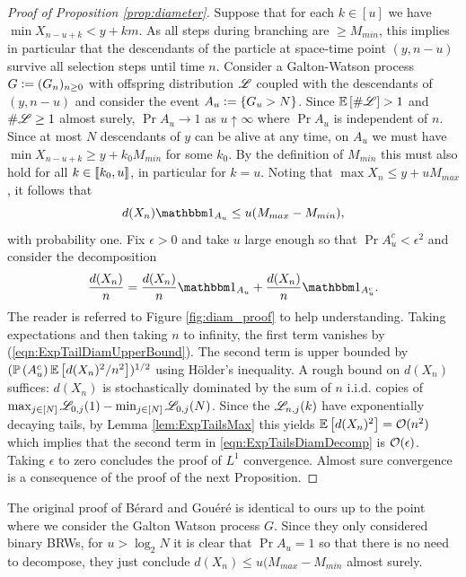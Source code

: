 \begin{proof}[Proof of Proposition \ref{prop:diameter}]
Suppose that for each $k \in [u]$ we have $\min X_{n - u + k} < y + k m$. As all steps during branching are $ \geq M_{min}$, this implies in particular that the descendants of the particle at space-time point $(y, n-u)$ survive all selection steps until time $n$. Consider a Galton-Watson process $G \defeq (G_n)_{n \geq 0}$ with offspring distribution $\scr{L}$ coupled with the descendants of $(y, n-u)$ and consider the event $A_u \defeq \{ G_u > N\}$. Since $\Ex{\#\scr{L}} > 1$ and $\#\scr{L} \geq 1$ almost surely, $\Pr{A_u} \to 1$ as $u \uparrow \infty$ where $\Pr{A_u}$ is independent of $n$. Since at most $N$ descendants of $y$ can be alive at any time, on $A_u$ we must have $\min X_{n - u + k} \geq y + k_0 M_{min}$ for some $k_0$. By the definition of $M_{min}$ this must also hold for all $k \in \bbracket{k_0, u}$, in particular for $k = u$. Noting that $\max X_n \leq y + u M_{max}$, it follows that 
\begin{equation}\label{eqn:ExpTailDiamUpperBound}
d(X_n)\Ind_{A_u} \leq u (M_{max} - M_{min}), 
\end{equation}
with probability one. Fix $\epsilon > 0$ and take $u$ large enough so that $\Pr{A_u^c} < \epsilon^2$ and consider the decomposition
\begin{equation}\label{eqn:ExpTailsDiamDecomp}
\frac{d(X_n)}{n} = \frac{d(X_n)}{n} \Ind_{A_u} + \frac{d(X_n)}{n} \Ind_{A_u^c}. 
\end{equation}
The reader is referred to Figure \ref{fig:diam_proof} to help understanding. Taking expectations and then taking $n$ to infinity, the first term vanishes by (\ref{eqn:ExpTailDiamUpperBound}). The second term is upper bounded by $(\Pr{A_u^c} \Ex{d(X_n)^2 / n^2})^{1/2}$ using Hölder's inequality. A rough bound on $d(X_n)$ suffices: $d(X_n)$ is stochastically dominated by the sum of $n$ i.i.d. copies of $\max_{j \in [N]} \scr{L}_{0, j}(1) - \min_{j \in [N]} \scr{L}_{0,j}(N)$. Since the $\scr{L}_{n,j}(k)$ have exponentially decaying tails, by Lemma \ref{lem:ExpTailsMax} this yields $\Ex{d(X_n)^2} = \cal{O}(n^2)$ which implies that the second term in \ref{eqn:ExpTailsDiamDecomp} is $\cal{O}(\epsilon)$. Taking $\epsilon$ to zero concludes the proof of $L^1$ convergence. Almost sure convergence is a consequence of the proof of the next Proposition. 
\end{proof}

The original proof of Bérard and Gouéré is identical to ours up to the point where we consider the Galton Watson process $G$. Since they only considered binary BRWs, for $u > \log_2 N$ it is clear that $\Pr{A_u} = 1$ so that there is no need to decompose, they just conclude $d(X_n) \leq u(M_{max} - M_{min}$ almost surely. 

